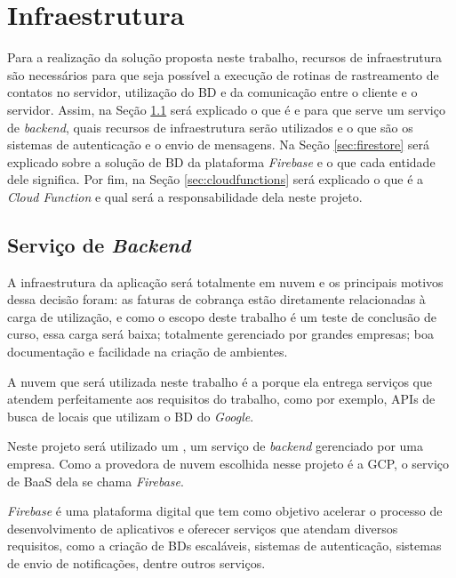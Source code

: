 \chapter{Infraestrutura}\label{chp:infraestrutura}

Para a realização da solução proposta neste trabalho, recursos de infraestrutura são necessários para que seja possível a execução de rotinas de rastreamento de contatos no servidor, utilização do BD e da comunicação entre o cliente e o servidor. Assim, na Seção \ref{sec:firebase} será explicado o que é e para que serve um serviço de \textit{backend}, quais recursos de infraestrutura serão utilizados e o que são os sistemas de autenticação e o envio de mensagens. Na Seção \ref{sec:firestore} será explicado sobre a solução de BD da plataforma \textit{Firebase} e o que cada entidade dele significa. Por fim, na Seção \ref{sec:cloudfunctions} será explicado o que é a \textit{Cloud Function} e qual será a responsabilidade dela neste projeto.

\section{Serviço de \textit{Backend}}\label{sec:firebase}

A infraestrutura da aplicação será totalmente em nuvem e os principais motivos dessa decisão foram: as faturas de cobrança estão diretamente relacionadas à carga de utilização, e como o escopo deste trabalho é um teste de conclusão de curso, essa carga será baixa; totalmente gerenciado por grandes empresas; boa documentação e facilidade na criação de ambientes.

A nuvem que será utilizada neste trabalho é a  porque ela entrega serviços que atendem perfeitamente aos requisitos do trabalho, como por exemplo, APIs de busca de locais que utilizam o BD do \textit{Google}.

Neste projeto será utilizado um , um serviço de \textit{backend} gerenciado por uma empresa. Como a provedora de nuvem escolhida nesse projeto é a GCP, o serviço de BaaS dela se chama \textit{Firebase}.

\textit{Firebase} é uma plataforma digital que tem como objetivo acelerar o processo de desenvolvimento de aplicativos e oferecer serviços que atendam diversos requisitos, como a criação de BDs escaláveis, sistemas de autenticação, sistemas de envio de notificações, dentre outros serviços.

